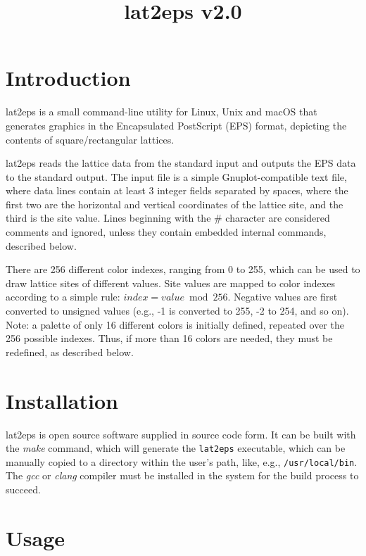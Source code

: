 \documentclass[a4paper]{article}
\title{\vspace{-5ex}lat2eps v2.0}
\author{}
\date{\vspace{-5ex}}
\begin{document}
\maketitle


\section{Introduction}

lat2eps is a small command-line utility for Linux, Unix and macOS that generates graphics in the Encapsulated PostScript (EPS) format, depicting the contents of square/rectangular lattices.
\bigbreak

lat2eps reads the lattice data from the standard input and outputs the EPS data to the standard output. The input file is a simple Gnuplot-compatible text file, where data lines contain at least 3 integer fields separated by spaces, where the first two are the horizontal and vertical coordinates of the lattice site, and the third is the site value. Lines beginning with the \# character are considered comments and ignored, unless they contain embedded internal commands, described below.
\bigbreak

There are 256 different color indexes, ranging from 0 to 255, which can be used to draw lattice sites of different values. Site values are mapped to color indexes according to a simple rule: $index = value \bmod 256$. Negative values are first converted to unsigned values (e.g., -1 is converted to 255, -2 to 254, and so on). Note: a palette of only 16 different colors is initially defined, repeated over the 256 possible indexes. Thus, if more than 16 colors are needed, they must be redefined, as described below.
\bigbreak


\section{Installation}

lat2eps is open source software supplied in source code form. It can be built with the \textit{make} command, which will generate the \texttt{lat2eps} executable, which can be manually copied to a directory within the user's path, like, e.g., \texttt{/usr/local/bin}. The \textit{gcc} or \textit{clang} compiler must be installed in the system for the build process to succeed.
\bigbreak


\section{Usage}
\end{document}
